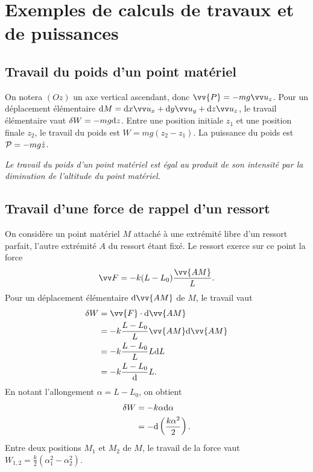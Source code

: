 \section{Exemples de calculs de travaux et de puissances}%
\label{chap-4sec:exemplesdecalculs}%
\subsection{Travail du poids d'un point matériel}%
\label{chap4-subsec:travaildupoids}%
On notera \((Oz)\) un axe vertical ascendant, donc \(\vv{P}=-mg\uz\). Pour un 
déplacement élémentaire \(\D M = \D x \ux + \D y \uy + \D z \uz\), le travail 
élémentaire vaut \(\delta W = -mg\D z\). Entre une position initiale \(z_1\) et 
une position finale \(z_2\), le travail du poids est \(W=mg(z_2-z_1)\). La 
puissance du poids est \(\P=-mg\dot{z}\).

\emph{Le travail du poids d'un point matériel est égal au produit de son 
intensité par la diminution de l'altitude du point matériel.}%

\subsection{Travail d'une force de rappel d'un ressort}%
\label{chap4-subsec:travailduneforcederappel}%

On considère un point matériel \(M\) attaché à une extrémité libre d'un ressort 
parfait, l'autre extrémité \(A\) du ressort étant fixé. Le ressort exerce sur 
ce point la force
\begin{equation}%
  \vF = -k(L-L_0)\frac{\vv{AM}}{L}.
\end{equation}%
Pour un déplacement élémentaire \(\D \vv{AM}\) de \(M\), le travail vaut
\begin{align}%
  \delta W &= \vv{F} \cdot \D \vv{AM} \\
  &= -k \frac{L-L_0}{L} \vv{AM} \D \vv{AM} \\
  &= -k \frac{L-L_0}{L} L \D L \\
  &= -k \frac{L-L_0} \D L.
\end{align}%
En notant l'allongement \(\alpha = L-L_0\), on obtient
\begin{align}%
  \delta W &= -k\alpha \D \alpha\\
  &=-\D \left(\frac{k\alpha^2}{2}\right).
\end{align}%
Entre deux positions \(M_1\) et \(M_2\) de \(M\), le travail de la force vaut 
\(W_{1,2}=\frac{k}{2}(\alpha_1^2-\alpha_2^2)\).

